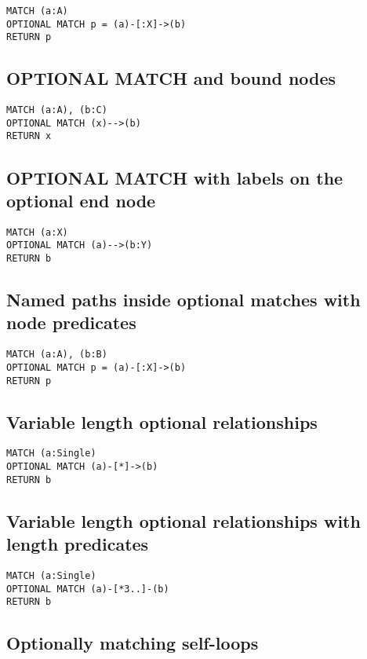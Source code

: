 \begin{lstlisting}
MATCH (a:A)
OPTIONAL MATCH p = (a)-[:X]->(b)
RETURN p
\end{lstlisting}

\subsection{OPTIONAL MATCH and bound nodes}

\begin{lstlisting}
MATCH (a:A), (b:C)
OPTIONAL MATCH (x)-->(b)
RETURN x
\end{lstlisting}

\subsection{OPTIONAL MATCH with labels on the optional end node}

\begin{lstlisting}
MATCH (a:X)
OPTIONAL MATCH (a)-->(b:Y)
RETURN b
\end{lstlisting}

\subsection{Named paths inside optional matches with node predicates}

\begin{lstlisting}
MATCH (a:A), (b:B)
OPTIONAL MATCH p = (a)-[:X]->(b)
RETURN p
\end{lstlisting}

\subsection{Variable length optional relationships}

\begin{lstlisting}
MATCH (a:Single)
OPTIONAL MATCH (a)-[*]->(b)
RETURN b
\end{lstlisting}

\subsection{Variable length optional relationships with length predicates}

\begin{lstlisting}
MATCH (a:Single)
OPTIONAL MATCH (a)-[*3..]-(b)
RETURN b
\end{lstlisting}

\subsection{Optionally matching self-loops}


